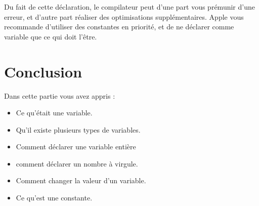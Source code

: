 Du fait de cette déclaration, le compilateur peut d'une part vous prémunir d'une erreur, et
d'autre part réaliser des optimisations supplémentaires. Apple vous recommande d'utiliser
des constantes en priorité, et de ne déclarer comme variable que ce qui doit l'être.
\section*{Conclusion}
{}
Dans cette partie vous avez appris :
\begin{itemize}
\item Ce qu'était une variable.
\item Qu'il existe plusieurs types de variables.
\item Comment déclarer une variable entière
\item comment déclarer un nombre à virgule.
\item Comment changer la valeur d'un variable.
\item Ce qu'est une constante.
\end{itemize}
